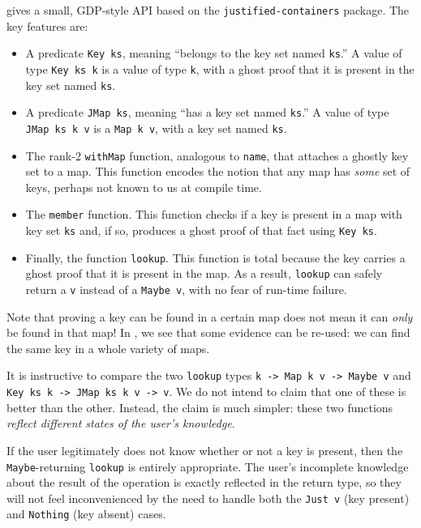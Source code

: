 \documentclass[format=sigplan, review=false, screen=true]{acmart}
\makeatletter
\let\origsubsection\subsection
\renewcommand\subsection{\@ifstar{\starsubsection}{\nostarsubsection}}
\newcommand\nostarsubsection[1]
{\subsectionprelude\origsubsection{#1}\subsectionpostlude}
\newcommand\starsubsection[1]
{\subsectionprelude\origsubsection*{#1}\subsectionpostlude}
\newcommand\subsectionprelude{%
  \vspace{-0.25em}
}
\newcommand\subsectionpostlude{%
  \vspace{-0.05em}
}
\makeatother
\begin{document}
 gives a small, GDP-style API based on the \texttt{justified-containers}
package. The key features are:
\begin{itemize}
\item A predicate \texttt{Key ks}, meaning ``belongs to the key set named \texttt{ks}.''
  A value of type \texttt{Key ks k} is a value of type \texttt{k}, with a ghost proof
  that it is present in the key set named \texttt{ks}.
\item A predicate \texttt{JMap ks}, meaning ``has a key set named \texttt{ks}.'' A value
  of type \texttt{JMap ks k v} is a \texttt{Map k v}, with a key set named \texttt{ks}.
\item The rank-2 \texttt{withMap} function, analogous to \texttt{name}, that attaches
  a ghostly key set to a map. This function encodes the notion that any map has
  \emph{some} set of keys, perhaps not known to us at compile time.
\item The \texttt{member} function. This function checks if a key is present in a map
  with key set \texttt{ks} and,
  if so, produces a ghost proof of that fact using \texttt{Key ks}.
\item Finally, the function \texttt{lookup}. This function is total because the
  key carries a ghost proof that it is present in the map. As a result, \texttt{lookup}
  can safely return
  a \texttt{v} instead of a \texttt{Maybe v}, with no fear of run-time failure.
\end{itemize}

Note that proving a key can be found in a certain map does not mean it can \emph{only}
be found in that map! In , we see that some evidence can be re-used:
we can find the same key in a whole variety of maps.

\subsection{Designing for the user's state of knowledge}
It is instructive to compare the two \texttt{lookup} types \texttt{k -> Map k v -> Maybe v}
and \texttt{Key ks k -> JMap ks k v -> v}. We do not intend to claim that
one of these is better than the other. Instead, the claim is much simpler: these two functions
\emph{reflect different states of the user's knowledge}.

If the user legitimately does not know whether or not a key is present, then the
\texttt{Maybe}-returning \texttt{lookup} is entirely appropriate. The user's incomplete knowledge
about the result of the operation is exactly reflected in the return type, so they will
not feel inconvenienced by the need to handle both the \texttt{Just v} (key present)
and \texttt{Nothing} (key absent) cases.
\end{document}
